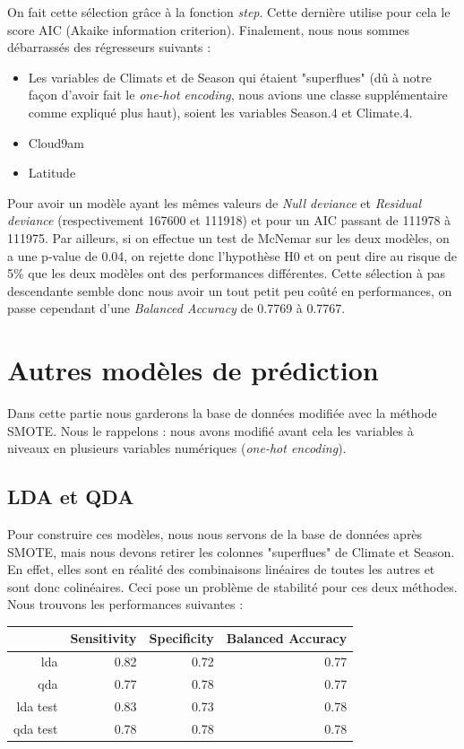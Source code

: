 \documentclass{article}
\begin{document}
On fait cette sélection grâce à la fonction \emph{step}. Cette dernière utilise pour cela le score AIC (Akaike information criterion). Finalement, nous nous sommes débarrassés des régresseurs suivants : 
\begin{itemize}
    \item Les variables de Climats et de Season qui étaient "superflues" (dû à notre façon d'avoir fait le \emph{one-hot encoding}, nous avions une classe supplémentaire comme expliqué plus haut), soient les variables Season.4 et Climate.4. 
    \item Cloud9am
    \item Latitude
\end{itemize}
Pour avoir un modèle ayant les mêmes valeurs de \emph{Null deviance} et \emph{Residual deviance} (respectivement 167600 et 111918) et pour un AIC passant de 111978 à 111975. Par ailleurs, si on effectue un test de McNemar sur les deux modèles, on a une p-value de 0.04, on rejette donc l'hypothèse H0 et on peut dire au risque de 5\% que les deux modèles ont des performances différentes. Cette sélection à pas descendante semble donc nous avoir un tout petit peu coûté en performances, on passe cependant d'une \emph{Balanced Accuracy} de 0.7769 à 0.7767.

\section{Autres modèles de prédiction}

Dans cette partie nous garderons la base de données modifiée avec la méthode SMOTE. Nous le rappelons : nous avons modifié avant cela les variables à niveaux en plusieurs variables numériques (\emph{one-hot encoding}). 

\subsection{LDA et QDA}

Pour construire ces modèles, nous nous servons de la base de données après SMOTE, mais nous devons retirer les colonnes "superflues" de Climate et Season. En effet, elles sont en réalité des combinaisons linéaires de toutes les autres et sont donc colinéaires. Ceci pose un problème de stabilité pour ces deux méthodes. Nous trouvons les performances suivantes : 
\begin{table}[ht]
    \centering
    \begin{tabular}{|r|rrr|}
        \hline
        & Sensitivity & Specificity & Balanced Accuracy \\ 
        \hline
        lda & 0.82 & 0.72 & 0.77 \\ 
        qda & 0.77 & 0.78 & 0.77 \\ 
        \hline
        \hline
        lda test & 0.83 & 0.73 & 0.78 \\ 
        qda test & 0.78 & 0.78 & 0.78 \\ 
        \hline
    \end{tabular}
\end{table}
\end{document}
